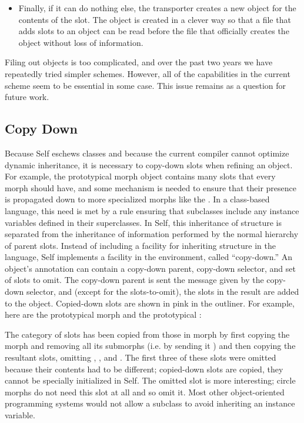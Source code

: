 \documentclass[letterpaper,10pt,english]{sphinxmanual}
\begin{document}
\begin{itemize}
\item {} 
Finally, if it can do nothing else, the transporter creates a new object for the contents of the
slot. The object is created in a clever way so that a file that adds slots to an object can be read
before the file that officially creates the object without loss of information.

\end{itemize}

Filing out objects is too complicated, and over the past two years we have repeatedly tried simpler
schemes. However, all of the capabilities in the current scheme seem to be essential in some case.
This issue remains as a question for future work.


\subsection{Copy Down}
\label{\detokenize{howtoprg:copy-down}}
Because Self eschews classes and because the current compiler cannot optimize dynamic inheritance,
it is necessary to copy-down slots when refining an object. For example, the prototypical
morph object contains many slots that every morph should have, and some mechanism is needed
to ensure that their presence is propagated down to more specialized morphs like the .
In a class-based language, this need is met by a rule ensuring that subclasses include any instance
variables defined in their superclasses. In Self, this inheritance of structure is separated from the
inheritance of information performed by the normal hierarchy of parent slots. Instead of including
a facility for inheriting structure in the language, Self implements a facility in the environment,
called “copy-down.” An object’s annotation can contain a copy-down parent, copy-down selector,
and set of slots to omit. The copy-down parent is sent the message given by the copy-down selector,
and (except for the slots-to-omit), the slots in the result are added to the object. Copied-down
slots are shown in pink in the outliner. For example, here are the prototypical morph and the prototypical
:
\begin{figure}[htbp]
\centering

\noindent{}
\end{figure}

The  category of slots has been copied from those in morph by first copying
the morph and removing all its submorphs (i.e. by sending it ) and then
copying the resultant slots, omitting , ,  and . The first
three of these slots were omitted because their contents had to be different; copied-down slots are
copied, they cannot be specially initialized in Self. The omitted slot  is more interesting;
circle morphs do not need this slot at all and so omit it. Most other object-oriented programming
systems would not allow a subclass to avoid inheriting an instance variable.
\end{document}
